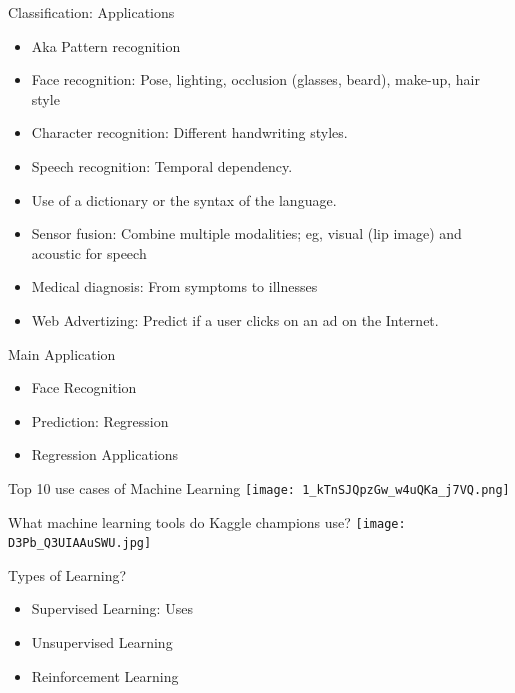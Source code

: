 \documentclass{beamer}
\begin{document}
\begin{frame}{Classification: Applications}
    \begin{itemize}
        \item Aka Pattern recognition
\item Face recognition: Pose, lighting, occlusion (glasses, beard), make-up, hair style 
\item Character recognition: Different handwriting styles.
\item Speech recognition: Temporal dependency. 
\item Use of a dictionary or the syntax of the language. 
\item Sensor fusion: Combine multiple modalities; eg, visual (lip image) and acoustic for speech
\item Medical diagnosis: From symptoms to illnesses
\item Web Advertizing: Predict if a user clicks on an ad on the Internet.
\end{itemize}
\end{frame}

\begin{frame}{Main Application}
    \begin{itemize}
        \item Face Recognition
        \item Prediction: Regression
        \item Regression Applications
    \end{itemize}
\end{frame}

\begin{frame}{Top 10 use cases of Machine Learning}
\texttt{[image: 1\_kTnSJQpzGw\_w4uQKa\_j7VQ.png]}
\centering
\end{frame}

\begin{frame}{What machine learning tools do Kaggle champions use?}
 \texttt{[image: D3Pb\_Q3UIAAuSWU.jpg]}
\centering   
\end{frame}

\begin{frame}{Types of Learning?}
\begin{itemize}
    \item Supervised Learning: Uses
    \item Unsupervised Learning
    \item Reinforcement Learning
\end{itemize}
\end{frame}
\end{document}
